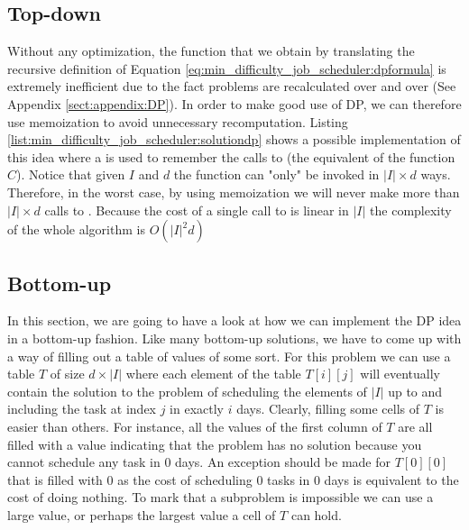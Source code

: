 \subsection{Top-down}
\label{sec:min_difficulty_job_scheduler_solution:dptopdown}
Without any optimization, the function that we obtain by translating the recursive definition of
Equation \ref{eq:min_difficulty_job_scheduler:dpformula} is extremely inefficient due to the fact
problems are recalculated over and over (See Appendix \ref{sect:appendix:DP}). In order to make good
use of DP, we can therefore use memoization to avoid unnecessary recomputation. Listing
\ref{list:min_difficulty_job_scheduler:solutiondp} shows a possible implementation of this idea
where a  is used to remember the calls to 
(the equivalent of the function $C$). Notice that given $I$ and $d$ the function can "only"  be
invoked in $|I| \times d$ ways. Therefore, in the worst case, by using memoization we will never
make more than $|I| \times d$ calls to . Because the cost of a single
call to  is linear in $|I|$ the complexity of the whole algorithm is
$O(|I|^2 d)$



\subsection{Bottom-up}
In this section, we are going to have a look at how we can implement the DP idea in a bottom-up
fashion. Like many bottom-up solutions, we have to come up with a way of filling out a table of
values of some sort. For this problem we can use a table $T$ of size $d \times |I|$  where each
element of the table $T[i][j]$ will eventually contain the solution to the problem of scheduling the
elements of $|I|$ up to and including the task at index $j$ in exactly $i$ days. Clearly, filling
some cells of  $T$ is easier than others. For instance, all the values of the first column of $T$
are all filled with a value indicating that the problem has no solution because you cannot schedule
any task in $0$ days. An exception should be made for $T[0][0]$ that is filled with $0$ as the cost
of scheduling $0$ tasks in $0$ days is equivalent to the cost of doing nothing. To mark that a
subproblem is impossible we can use a large value, or perhaps the largest value a cell of $T$ can
hold. 

